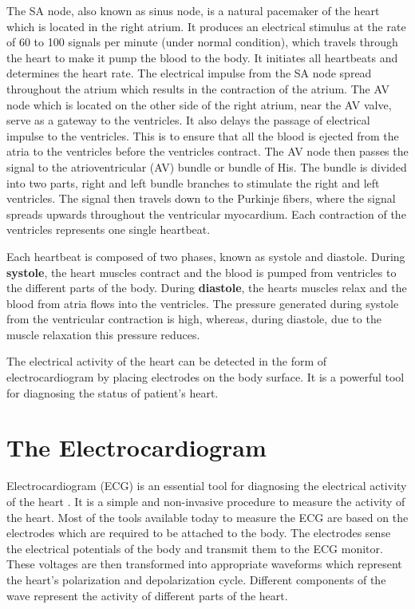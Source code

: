 The SA node, also known as sinus node, is a natural pacemaker of the heart which is located in the right atrium. It produces an electrical stimulus at the rate of 60 to 100 signals per minute (under normal condition), which travels through the heart to make it pump the blood to the body. It initiates all heartbeats and determines the heart rate. The electrical impulse from the SA node spread throughout the atrium which results in the contraction of the atrium. The AV node which is located on the other side of the right atrium, near the AV valve, serve as a gateway to the ventricles. It also delays the passage of electrical impulse to the ventricles. This is to ensure that all the blood is ejected from the atria to the ventricles before the ventricles contract. The AV node then passes the signal to the atrioventricular (AV) bundle or bundle of His. The bundle is divided into two parts, right and left bundle branches to stimulate the right and left ventricles. The signal then travels down to the Purkinje fibers, where the signal spreads upwards throughout the ventricular myocardium. Each contraction of the ventricles represents one single heartbeat.

Each heartbeat is composed of two phases, known as systole and diastole. During \textbf{systole}, the heart muscles contract and the blood is pumped from ventricles to the different parts of the body. During \textbf{diastole}, the hearts muscles relax and the blood from atria flows into the ventricles. The pressure generated during systole from the ventricular contraction is high, whereas, during diastole, due to the muscle relaxation this pressure reduces.

The electrical activity of the heart can be detected in the form of electrocardiogram by placing electrodes on the body surface. It is a powerful tool for diagnosing the status of patient's heart.



\section{The Electrocardiogram} \label{the_electrocardiogram}

Electrocardiogram (ECG) is an essential tool for diagnosing the electrical activity of the heart \cite{wilkins2005ecg}. It is a simple and non-invasive procedure to measure the activity of the heart. Most of the tools available today to measure the ECG are based on the electrodes which are required to be attached to the body. The electrodes sense the electrical potentials of the body and transmit them to the ECG monitor. These voltages are then transformed into appropriate waveforms which represent the heart's polarization and depolarization cycle. Different components of the wave represent the activity of different parts of the heart.



